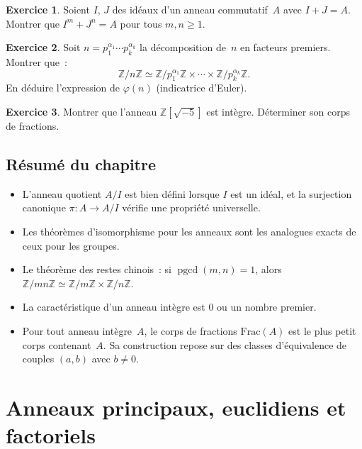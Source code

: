 \documentclass[12pt,a4paper,openany]{book}
\theoremstyle{definition}
\newtheorem{exercice}{Exercice}[chapter]
\newcommand{\Z}{\mathbb{Z}}
\DeclareMathOperator{\pgcd}{pgcd}
\begin{document}
\begin{exercice}\label{exo:quot-9}
Soient $I$, $J$ des idéaux d'un anneau commutatif~$A$ avec $I + J = A$.
Montrer que $I^m + J^n = A$ pour tous $m, n \geqslant 1$.
\end{exercice}

\begin{exercice}\label{exo:quot-10}
Soit $n = p_1^{\alpha_1} \cdots p_k^{\alpha_k}$ la décomposition de~$n$
en facteurs premiers. Montrer que~:
\[
  \Z/n\Z \simeq \Z/p_1^{\alpha_1}\Z \times \cdots
  \times \Z/p_k^{\alpha_k}\Z.
\]
En déduire l'expression de $\varphi(n)$ (indicatrice d'Euler).
\end{exercice}

\begin{exercice}\label{exo:quot-11}
Montrer que l'anneau $\Z[\sqrt{-5}]$ est intègre. Déterminer son corps
de fractions.
\end{exercice}

\section*{Résumé du chapitre~\thechapter}

\begin{itemize}
  \item L'anneau quotient $A/I$ est bien défini lorsque $I$ est un idéal,
        et la surjection canonique $\pi \colon A \to A/I$ vérifie une
        propriété universelle.
  \item Les théorèmes d'isomorphisme pour les anneaux sont les analogues
        exacts de ceux pour les groupes.
  \item Le théorème des restes chinois~: si $\pgcd(m,n) = 1$, alors
        $\Z/mn\Z \simeq \Z/m\Z \times \Z/n\Z$.
  \item La caractéristique d'un anneau intègre est $0$ ou un nombre
        premier.
  \item Pour tout anneau intègre~$A$, le corps de fractions
        $\mathrm{Frac}(A)$ est le plus petit corps contenant~$A$. Sa
        construction repose sur des classes d'équivalence de couples
        $(a,b)$ avec $b \neq 0$.
\end{itemize}



\chapter{Anneaux principaux, euclidiens et factoriels}%
\label{chap:principaux-factoriels}
\end{document}
